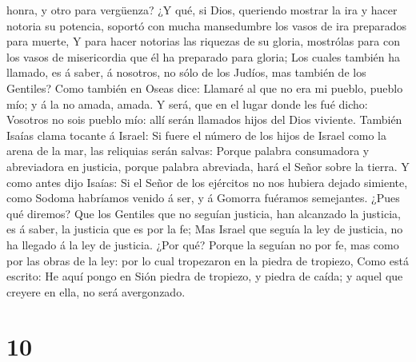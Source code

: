 honra, y otro para vergüenza?  ¿Y qué, si Dios, queriendo
mostrar la ira y hacer notoria su potencia, soportó con mucha
mansedumbre los vasos de ira preparados para muerte,  Y
para hacer notorias las riquezas de su gloria, mostrólas para con los
vasos de misericordia que él ha preparado para gloria;  Los
cuales también ha llamado, es á saber, á nosotros, no sólo de los
Judíos, mas también de los Gentiles?  Como también en Oseas
dice: Llamaré al que no era mi pueblo, pueblo mío; y á la no amada,
amada.  Y será, que en el lugar donde les fué dicho:
Vosotros no sois pueblo mío: allí serán llamados hijos del Dios
viviente.  También Isaías clama tocante á Israel: Si fuere
el número de los hijos de Israel como la arena de la mar, las reliquias
serán salvas:  Porque palabra consumadora y abreviadora en
justicia, porque palabra abreviada, hará el Señor sobre la tierra.
 Y como antes dijo Isaías: Si el Señor de los ejércitos no
nos hubiera dejado simiente, como Sodoma habríamos venido á ser, y á
Gomorra fuéramos semejantes.  ¿Pues qué diremos? Que los
Gentiles que no seguían justicia, han alcanzado la justicia, es á saber,
la justicia que es por la fe;  Mas Israel que seguía la ley
de justicia, no ha llegado á la ley de justicia.  ¿Por qué?
Porque la seguían no por fe, mas como por las obras de la ley: por lo
cual tropezaron en la piedra de tropiezo,  Como está
escrito: He aquí pongo en Sión piedra de tropiezo, y piedra de caída; y
aquel que creyere en ella, no será avergonzado.

\hypertarget{section-9}{%
\section{10}\label{section-9}}

